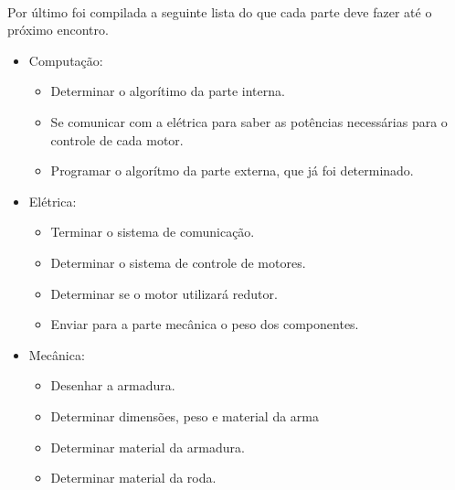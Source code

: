 \documentclass{article}
\begin{document}
        \paragraph{}
        Por último foi compilada a seguinte lista do que cada parte deve fazer até o próximo encontro.
        \begin{itemize}
            \item Computação:
            \begin{itemize}
                \item Determinar o algorítimo da parte interna.
                \item Se comunicar com a elétrica para saber as potências necessárias para o controle de cada motor.
                \item Programar o algorítmo da parte externa, que já foi determinado.
            \end{itemize}

            \item Elétrica:
            \begin{itemize}
                \item Terminar o sistema de comunicação.
                \item Determinar o sistema de controle de motores.
                \item Determinar se o motor utilizará redutor.
                \item Enviar para a parte mecânica o peso dos componentes.
            \end{itemize}

            \item Mecânica:
            \begin{itemize}
                \item Desenhar a armadura.
                \item Determinar dimensões, peso e material da arma
                \item Determinar material da armadura.
                \item Determinar material da roda.
            \end{itemize}
        \end{itemize}
\end{document}
